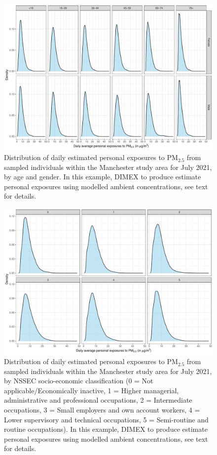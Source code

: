 \documentclass{article}
\begin{document}
\begin{figure}[!hbtp]
	\centering
	\includegraphics[width=0.72\linewidth]{Figures/Fig4b_AgeGr_Sex}		
	\caption{Distribution of daily estimated personal exposures to PM$_{2.5}$ from sampled individuals within the Manchester study area for July 2021, by age and gender. In this example, DIMEX to produce estimate personal exposures using modelled ambient concentrations, see text for details. } \label{fig::Fig4b_AgeGr_Sex}
\end{figure}

\begin{figure}[!hbtp]
	\centering
	\includegraphics[width=0.72\linewidth]{Figures/Fig4b_nssec5}		
	\caption{Distribution of daily estimated personal exposures to PM$_{2.5}$ from sampled individuals within the Manchester study area for July 2021, by NSSEC socio-economic classification (0 = Not applicable/Economically inactive, 1 = Higher managerial, administrative and professional occupations, 2 = Intermediate occupations, 3 = Small employers and own account workers, 4 = Lower supervisory and technical occupations, 5 = Semi-routine and routine occupations). In this example, DIMEX to produce estimate personal exposures using modelled ambient concentrations, see text for details. } \label{fig::Fig4b_nssec5}
\end{figure}
\end{document}
